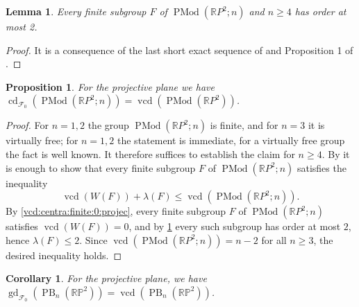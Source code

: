 \documentclass[a4paper,12pt,leqno]{amsart}
\newtheorem{proposition}[theorem]{Proposition}
\newtheorem{corollary}[theorem]{Corollary}
\newtheorem{lemma}[theorem]{Lemma}
\theoremstyle{definition}
\newcommand{\calF}{{\mathcal F}}
\DeclareMathOperator{\cd}{cd}
\DeclareMathOperator{\vcd}{vcd}
\DeclareMathOperator{\gd}{gd}
\DeclareMathOperator{\pmcg}{PMod}
\DeclareMathOperator{\pb}{PB}
\begin{document}
\begin{lemma}\label{finite:sungroup:ord:ateast2}
    Every finite subgroup $F$ of $\pmcg(\mathbb{R}P^2;n)$ and $n\geq 4$ has order at most 2.
\end{lemma}
\begin{proof}
It is a consequence of the last short exact sequence of \cite[Section~2.4]{MR3382024} and Proposition 1 of \cite{MR2607582}.  
\end{proof}

\begin{proposition}
    For the projective plane we have $\cd_{\calF_0}(\pmcg(\mathbb{R}P^2;n))=\vcd(\pmcg(\mathbb{R}P^2))$.
\end{proposition}
\begin{proof}
    For $n=1,2$ the group $\pmcg(\mathbb{R}P^2;n)$ is finite, and for $n=3$ it is virtually free; for $n=1,2$ the statement is immediate, for a virtually free group the fact is well known. It therefore suffices to establish the claim for $n\ge 4$.
    By \cite[Theorem 3.3]{AMP14} it is enough to show that every finite subgroup $F$ of $\pmcg(\mathbb{R}P^2;n)$ satisfies the inequality
    \[
        \vcd(W(F))+\lambda(F)\leq \vcd(\pmcg(\mathbb{R}P^2;n)).
    \]
    By \cref{vcd:centra:finite:0:projec}, every finite subgroup $F$ of $\pmcg(\mathbb{R}P^2;n)$ satisfies $\vcd(W(F))=0$, and by \cref{finite:sungroup:ord:ateast2} every such subgroup has order at most $2$, hence $\lambda(F)\leq 2$. Since $\vcd(\pmcg(\mathbb{R}P^2;n))=n-2$ for all $n\ge 3$, the desired inequality holds.
\end{proof}



\begin{corollary}\label{vcd:gdfin:pure:projec}
    For the projective plane, we have $\gd_{\calF_0}(\pb_n(\mathbb{RP}^2)) = \vcd(\pb_n(\mathbb{RP}^2))$.
\end{corollary}
\end{document}
